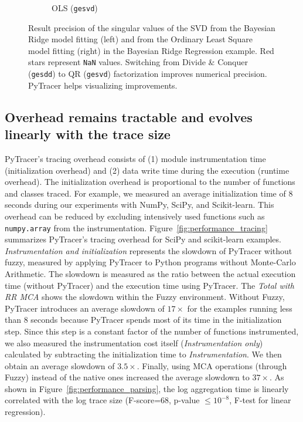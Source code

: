 \documentclass[10pt,journal,compsoc]{IEEEtran}
\newcommand{\pytracer}[0]{PyTracer\xspace}
\DeclareRobustCommand{\add}[1]{\textcolor{ao(english)}{#1}}%
\DeclareRobustCommand{\add}[1]{#1}
\begin{document}
\begin{figure}
\begin{subfigure}{0.49\linewidth}
        \caption{OLS (\texttt{gesvd})}
        \label{fig:OLS_svd_fixed}
    \end{subfigure}
    \caption{Result precision of the singular values of the SVD from the
        Bayesian Ridge model fitting (left) and from the Ordinary Least Square model
        fitting (right) in the Bayesian Ridge Regression example. Red stars
        represent \texttt{NaN} values. 
        Switching from Divide \& Conquer (\texttt{gesdd}) to QR (\texttt{gesvd}) factorization improves numerical precision.
        PyTracer helps visualizing improvements.}
\end{figure}

\subsection{Overhead remains tractable and evolves linearly with the trace size}

\pytracer's tracing overhead consists of (1) module instrumentation time
(initialization overhead) and (2) data write time during the execution (runtime
overhead). The initialization overhead is proportional to the number of
functions and classes traced. For example, we measured an average initialization
time of 8 seconds during our experiments with  NumPy, SciPy, and Scikit-learn.
This overhead can be reduced by excluding intensively used functions such as
\texttt{numpy.array} from the instrumentation.
Figure~\ref{fig:performance_tracing} summarizes \pytracer's tracing overhead for
SciPy and scikit-learn examples. \textit{Instrumentation and initialization} represents the slowdown of
\pytracer without fuzzy, \add{measured by applying PyTracer to Python programs without Monte-Carlo Arithmetic.}
The slowdown is measured as the ratio between the actual execution time
(without \pytracer) and the execution time using \pytracer. 
The \textit{Total with RR MCA} shows the slowdown within the Fuzzy environment.
Without Fuzzy, \pytracer introduces an average slowdown of $17\times$ for
the examples running less than 8 seconds because \pytracer spends most of its
time in the initialization step. Since this step is a constant factor of the
number of functions instrumented, we also measured the instrumentation cost
itself (\textit{Instrumentation only}) calculated by subtracting the
initialization time to \textit{Instrumentation}. We then obtain an average slowdown of
$3.5\times$. Finally, using MCA
operations (through Fuzzy) instead of the native ones increased the average
slowdown to $37\times$.
\add{As shown in Figure~\ref{fig:performance_parsing}, the log aggregation time is linearly correlated with the log trace size (F-score=68, p-value $\leq 10^{-8}$, F-test for linear regression).}
\end{document}

